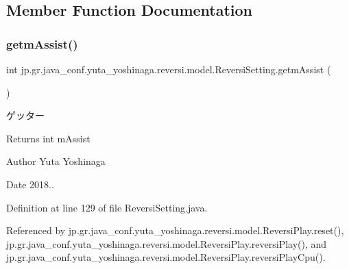 \subsection{Member Function Documentation}
\mbox{\label{classjp_1_1gr_1_1java__conf_1_1yuta__yoshinaga_1_1reversi_1_1model_1_1_reversi_setting_af2908862110772eff9fec1bcd153fd2e}} 
\subsubsection{\texorpdfstring{getm\+Assist()}{getmAssist()}}
{\footnotesize\ttfamily int jp.\+gr.\+java\+\_\+conf.\+yuta\+\_\+yoshinaga.\+reversi.\+model.\+Reversi\+Setting.\+getm\+Assist (\begin{DoxyParamCaption}{ }\end{DoxyParamCaption})}



ゲッター 

\begin{DoxyReturn}{Returns}
int m\+Assist 
\end{DoxyReturn}
\begin{DoxyAuthor}{Author}
Yuta Yoshinaga 
\end{DoxyAuthor}
\begin{DoxyDate}{Date}
2018.. 
\end{DoxyDate}


Definition at line 129 of file Reversi\+Setting.\+java.



Referenced by jp.\+gr.\+java\+\_\+conf.\+yuta\+\_\+yoshinaga.\+reversi.\+model.\+Reversi\+Play.\+reset(), jp.\+gr.\+java\+\_\+conf.\+yuta\+\_\+yoshinaga.\+reversi.\+model.\+Reversi\+Play.\+reversi\+Play(), and jp.\+gr.\+java\+\_\+conf.\+yuta\+\_\+yoshinaga.\+reversi.\+model.\+Reversi\+Play.\+reversi\+Play\+Cpu().

